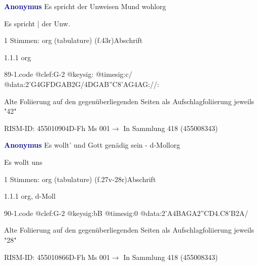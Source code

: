 \documentclass[twocolumn]{book}
\begin{document}
\par \vspace{7pt} \textcolor{darkblue}{\textbf{Anonymus  }}\hfillplus{\textbf{[89]}}\newline Es spricht der Unweisen Mund wohl\newline org
\par \begin{itshape}[f.43r, at left:] Es spricht | der Unw.\end{itshape} 
\par \textcolor{darkblue}{}  1 Stimmen: org (tabulature)  (f.43r)\newline Abschrift
\par 1.1.1  org  
\begin{filecontents*}{89-1.code}
@clef:G-2
@keysig:
@timesig:c/
@data:2'G4GFDGAB2G/4DGAB''C{8'AG}4AG://:
\end{filecontents*}
\newline
%
\par Alte Foliierung auf den gegenüberliegenden Seiten als Aufschlagfoliierung jeweils "42"
\par RISM-ID: 455010904\newline D-Fh  Ms 001\newline $\rightarrow$ In Sammlung 418 (455008343)
      
\par \vspace{7pt} \textcolor{darkblue}{\textbf{Anonymus  }}\hfillplus{\textbf{[90]}}\newline Es wollt' und Gott genädig sein - d-Moll\newline org
\par \begin{itshape}[f.27v, at left:] Es wollt uns\end{itshape} 
\par \textcolor{darkblue}{}  1 Stimmen: org (tabulature)  (f.27v-28r)\newline Abschrift
\par 1.1.1  org, d-Moll  
\begin{filecontents*}{90-1.code}
@clef:G-2
@keysig:bB
@timesig:0
@data:2'A4BAGA2''CD4.C8'B2A/
\end{filecontents*}
\newline
%
\par Alte Foliierung auf den gegenüberliegenden Seiten als Aufschlagfoliierung jeweils "28"
\par RISM-ID: 455010866\newline D-Fh  Ms 001\newline $\rightarrow$ In Sammlung 418 (455008343)
      
\end{document}
